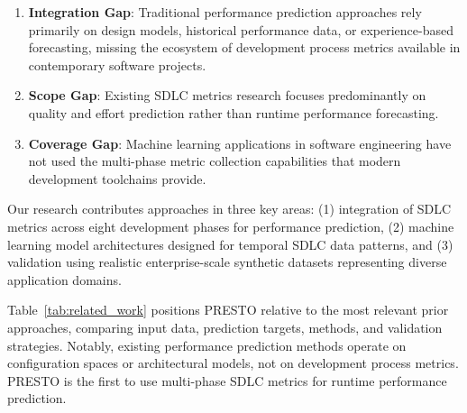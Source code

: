 \documentclass[technologies,article,submit,pdftex,moreauthors]{Definitions/mdpi}
\begin{document}
\begin{enumerate}
\def\labelenumi{\arabic{enumi}.}
\item
  \textbf{Integration Gap}: Traditional performance prediction
  approaches rely primarily on design models, historical performance
  data, or experience-based forecasting, missing the ecosystem of
  development process metrics available in contemporary software
  projects.
\item
  \textbf{Scope Gap}: Existing SDLC metrics research focuses
  predominantly on quality and effort prediction rather than runtime
  performance forecasting.
\item
  \textbf{Coverage Gap}: Machine learning applications in software
  engineering have not used the multi-phase metric collection
  capabilities that modern development toolchains provide.
\end{enumerate}

Our research contributes approaches in three key areas: (1) integration
of SDLC metrics across eight development phases for performance
prediction, (2) machine learning model architectures designed for
temporal SDLC data patterns, and (3) validation using realistic
enterprise-scale synthetic datasets representing diverse application
domains.

Table~\ref{tab:related_work} positions PRESTO relative to the most
relevant prior approaches, comparing input data, prediction targets,
methods, and validation strategies. Notably, existing performance
prediction methods operate on configuration spaces or architectural
models, not on development process metrics. PRESTO is the first to use
multi-phase SDLC metrics for runtime performance prediction.
\end{document}
